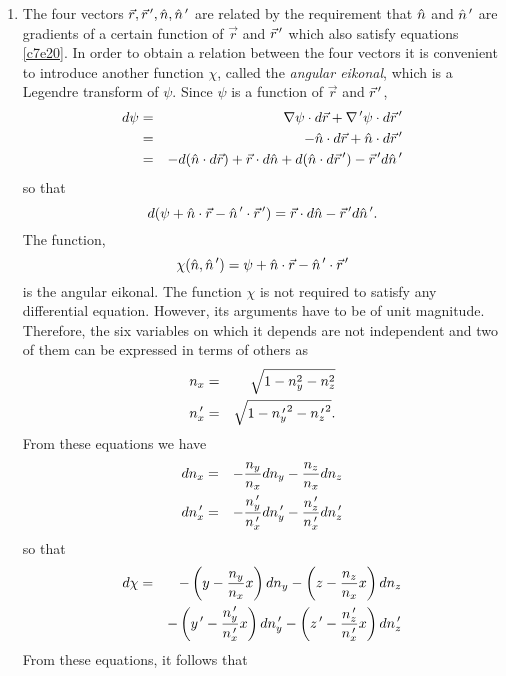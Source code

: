 \begin{enumerate}
\item The four vectors $\vec{r}, \vec{r}^{\,\prime}, \hat{n}, \hat{n}^{\,\prime}$ are related by
the requirement that $\hat{n}$ and $\hat{n}^{\,\prime}$ are gradients of a certain function
of $\vec{r}$ and $\vec{r}^{\,\prime}$ which also satisfy equations \eqref{c7e20}. In
order to obtain a relation between the four vectors it is convenient to 
introduce another function $\chi$, called the \emph{angular eikonal}, which is
a Legendre transform of $\psi$. Since $\psi$ is a function of $\vec{r}$ and
$\vec{r}^{\,\prime}$,
\begin{eqnarray*}
d\psi &=& \nabla\psi\cdot d\vec{r} + \nabla^{\,\prime}\psi\cdot d\vec{r}^{\,\prime} \\
 &=& -\hat{n}\cdot d\vec{r} + \hat{n}\cdot d\vec{r}^{\,\prime} \\
 &=& -d(\hat{n}\cdot d\vec{r}) + \vec{r}\cdot d\hat{n} + d(\hat{n}\cdot d\vec{r}^{\,\prime}) -
     \vec{r}^{\,\prime} d\hat{n}^{\,\prime}
\end{eqnarray*}
so that
\[
d(\psi + \hat{n}\cdot\vec{r} - \hat{n}^{\,\prime}\cdot\vec{r}^{\,\prime}) = 
\vec{r}\cdot d\hat{n} - \vec{r}^{\,\prime} d\hat{n}^{\,\prime}.
\]
The function,
\begin{equation}\label{c7e21}
\chi(\hat{n}, \hat{n}^{\,\prime}) = \psi + \hat{n}\cdot\vec{r} - \hat{n}^{\,\prime}\cdot\vec{r}^{\,\prime}
\end{equation}
is the angular eikonal. The function $\chi$ is not required to satisfy any
differential equation. However, its arguments have to be of unit magnitude.
Therefore, the six variables on which it depends are not independent and two
of them can be expressed in terms of others as
\begin{eqnarray}
n_x &=& \sqrt{1 - n_y^2 - n_z^2} \label{c7e22} \\
n_x^{\,\prime} &=& \sqrt{1 - {n_y^{\,\prime}}^2 - {n_z^{\,\prime}}^2} \label{c7e23}.
\end{eqnarray}
From these equations we have
\begin{eqnarray}
dn_x &=& -\frac{n_y}{n_x}dn_y - \frac{n_z}{n_x}dn_z \label{c7e24} \\
dn_x^{\,\prime} &=& -\frac{n_y^{\,\prime}}{n_x^{\,\prime}}dn_y^{\,\prime} - 
              \frac{n_z^{\,\prime}}{n_x^{\,\prime}}dn_z^{\,\prime} \label{c7e25}
\end{eqnarray}
so that 
\begin{eqnarray}
d\chi &=& -\left(y - \frac{n_y}{n_x}x\right) dn_y 
  -\left(z - \frac{n_z}{n_x}x\right) dn_z \nonumber \\
 & & -\left(y^{\,\prime} - \frac{n_y^{\,\prime}}{n_x^{\,\prime}}x\right) dn_y^{\,\prime} 
  -\left(z^{\,\prime} - \frac{n_z^{\,\prime}}{n_x^{\,\prime}}x\right) dn_z^{\,\prime} \label{c7e26}
\end{eqnarray}
From these equations, it follows that
\begin{eqnarray}

\end{eqnarray}
\end{enumerate}
